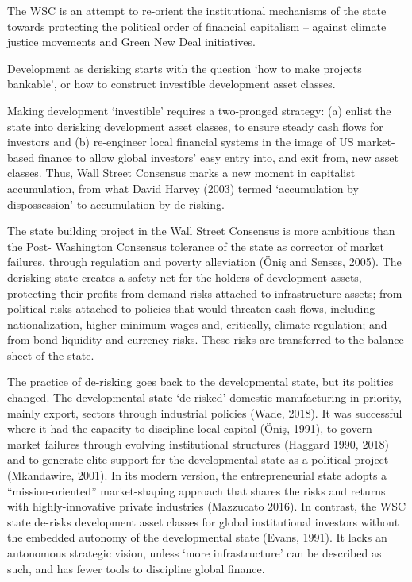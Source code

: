 \documentclass[
]{book}
\begin{document}
The WSC is an attempt to re-orient the institutional mechanisms of
the state towards protecting the political order of financial capitalism --
against climate justice movements and Green New Deal initiatives.

Development as derisking starts with the question `how to make projects bankable', or
how to construct investible development asset classes.

Making development `investible' requires a two-pronged strategy: (a) enlist the state
into derisking development asset classes, to ensure steady cash flows for investors and
(b) re-engineer local financial systems in the image of US market-based finance to
allow global investors' easy entry into, and exit from, new asset classes. Thus, Wall
Street Consensus marks a new moment in capitalist accumulation, from what David
Harvey (2003) termed `accumulation by dispossession' to accumulation by de-risking.

The state building project in the Wall Street Consensus is more ambitious than the Post-
Washington Consensus tolerance of the state as corrector of market failures, through
regulation and poverty alleviation (Öniş and Senses, 2005). The derisking state creates
a safety net for the holders of development assets, protecting their profits from demand
risks attached to infrastructure assets; from political risks attached to policies that would
threaten cash flows, including nationalization, higher minimum wages and, critically,
climate regulation; and from bond liquidity and currency risks. These risks are
transferred to the balance sheet of the state.

The practice of de-risking goes back to the developmental state, but its politics changed.
The developmental state `de-risked' domestic manufacturing in priority, mainly export,
sectors through industrial policies (Wade, 2018). It was successful where it had the
capacity to discipline local capital (Öniş, 1991), to govern market failures through
evolving institutional structures (Haggard 1990, 2018) and to generate elite support for
the developmental state as a political project (Mkandawire, 2001). In its modern
version, the entrepreneurial state adopts a ``mission-oriented'' market-shaping approach
that shares the risks and returns with highly-innovative private industries (Mazzucato
2016). In contrast, the WSC state de-risks development asset classes for global
institutional investors without the embedded autonomy of the developmental state
(Evans, 1991). It lacks an autonomous strategic vision, unless `more infrastructure' can
be described as such, and has fewer tools to discipline global finance.
\end{document}
